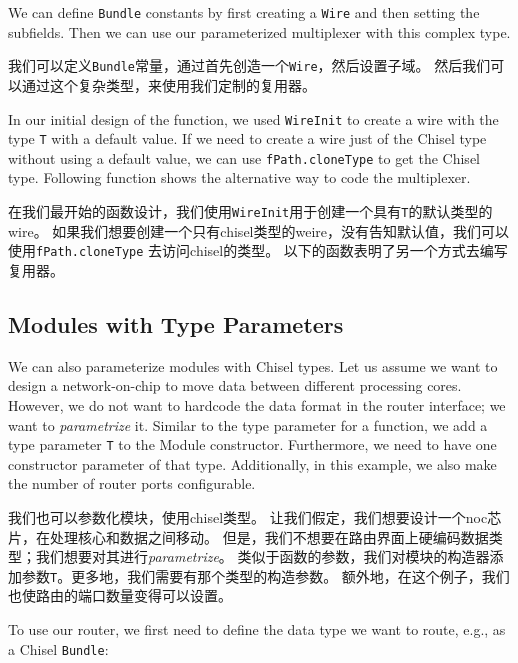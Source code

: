 \documentclass[%
    10pt,
    headinclude, footexclude,
    openright, %
    notitlepage,
    cleardoubleempty,
    headsepline,
    pointlessnumbers,
    bibtotoc, idxtotoc,
    ]{scrbook}
\newcommand{\code}[1]{{\small{\texttt{#1}}}}
\begin{document}
{

\noindent We can define \code{Bundle} constants by first creating
a \code{Wire} and then setting the subfields.
Then we can use our parameterized multiplexer with this complex type.

\noindent 我们可以定义\code{Bundle}常量，通过首先创造一个\code{Wire}，然后设置子域。
然后我们可以通过这个复杂类型，来使用我们定制的复用器。


In our initial design of the function, we used \code{WireInit}
to create a wire with the type \code{T} with a default value.
If we need to create a wire just of the Chisel type without using a default
value, we can use \code{fPath.cloneType} to get the Chisel type.
Following function shows the alternative way to code the multiplexer.

在我们最开始的函数设计，我们使用\code{WireInit}用于创建一个具有\code{T}的默认类型的wire。
如果我们想要创建一个只有chisel类型的weire，没有告知默认值，我们可以使用\code{fPath.cloneType}
去访问chisel的类型。
以下的函数表明了另一个方式去编写复用器。


\subsection{Modules with Type Parameters}

We can also parameterize modules with Chisel types.
Let us assume we want to design a network-on-chip to move data between
different processing cores. However, we do not want to hardcode the
data format in the router interface; we want to \emph{parametrize} it.
Similar to the type parameter for a function, we add a type parameter \code{T}
to the Module constructor. Furthermore, we need to have one constructor
parameter of that type. Additionally, in this example, we also make the number
of router ports configurable.

我们也可以参数化模块，使用chisel类型。
让我们假定，我们想要设计一个noc芯片，在处理核心和数据之间移动。
但是，我们不想要在路由界面上硬编码数据类型；我们想要对其进行\emph{parametrize}。
类似于函数的参数，我们对模块的构造器添加参数\code{T}。更多地，我们需要有那个类型的构造参数。
额外地，在这个例子，我们也使路由的端口数量变得可以设置。


\noindent To use our router, we first need to define the data type we want to route, e.g.,
as a Chisel \code{Bundle}:

}
\end{document}
